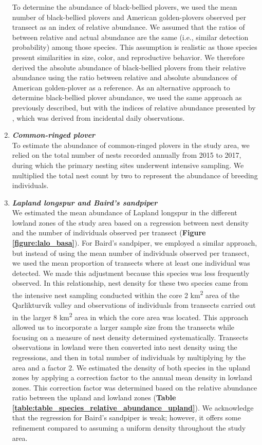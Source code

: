 \documentclass[a4paper,twoside,12pt]{article}
\begin{document}
\begin{enumerate}[label=\alph*.]
To determine the abundance of black-bellied plovers, we used the mean number of black-bellied plovers and American golden-plovers observed per transect as an index of relative abundance. We assumed that the ratios of between relative and actual abundance are the same (i.e., similar detection probability) among those species. This assumption is realistic as those species present similarities in size, color, and reproductive behavior. We therefore derived the absolute abundance of black-bellied plovers from their relative abundance using the ratio between relative and absolute abundances of American golden-plover as a reference.
As an alternative approach to determine black-bellied plover abundance, we used the same approach as previously described, but with the indices of relative abundance presented by \citet{gauthier2024a}, which was derived from incidental daily observations.
                \item[] \textit{\textbf{Common-ringed plover}}\\
                To estimate the abundance of common-ringed plovers in the study area, we relied on the total number of nests recorded annually from 2015 to 2017, during which the primary nesting sites underwent intensive sampling. We multiplied the total nest count by two to represent the abundance of breeding individuals.
                
                \item[] \textit{\textbf{Lapland longspur and Baird’s sandpiper}}\\
                We estimated the mean abundance of Lapland longspur in the different lowland zones of the study area based on a regression between nest density and the number of individuals observed per transect (\textbf{Figure \ref{figure:lalo_basa}}). For Baird’s sandpiper, we employed a similar approach, but instead of using the mean number of individuals observed per transect, we used the mean proportion of transects where at least one individual was detected. We made this adjustment because this species was less frequently observed. In this relationship, nest density for these two species came from the intensive nest sampling conducted within the core 2 km\textsuperscript{2} area of the Qarlikturvik valley and observations of individuals from transects carried out in the larger 8 km\textsuperscript{2} area in which the core area was located. This approach allowed us to incorporate a larger sample size from the transects while focusing on a measure of nest density determined systematically. Transects observations in lowland were then converted into nest density using the regressions, and then in total number of individuals by multiplying by the area and a factor 2. We estimated the density of both species in the upland zones by applying a correction factor to the annual mean density in lowland zones. This correction factor was determined based on the relative abundance ratio between the upland and lowland zones (\textbf{Table \ref{table:table_species_relative_abundance_upland}}). We acknowledge that the regression for Baird’s sandpiper is weak; however, it offers some refinement compared to assuming a uniform density throughout the study area. 
                

\end{enumerate}
\end{document}
